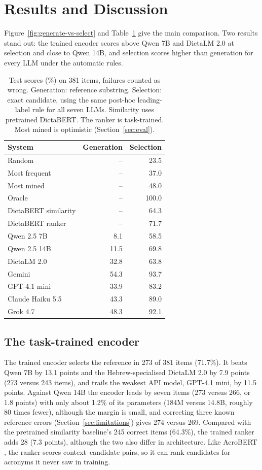 \section{Results and Discussion}
\label{sec:results}
Figure~\ref{fig:generate-vs-select} and Table~\ref{tab:test-results} give the main comparison. Two results stand out: the trained encoder scores above Qwen 7B and DictaLM 2.0 at selection and close to Qwen 14B, and selection scores higher than generation for every LLM under the automatic rules.
\begin{table}[H]
\centering\small
\begin{tabular}{@{}lrr@{}}
\toprule
System & Generation & Selection \\
\midrule
Random & -- & 23.5 \\
Most frequent & -- & 37.0 \\
Most mined & -- & 48.0 \\
Oracle & -- & 100.0 \\
\midrule
DictaBERT similarity & -- & 64.3 \\
DictaBERT ranker & -- & 71.7 \\
\midrule
Qwen 2.5 7B & 8.1 & 58.5 \\
Qwen 2.5 14B & 11.5 & 69.8 \\
DictaLM 2.0 & 32.8 & 63.8 \\
Gemini & 54.3 & 93.7 \\
GPT-4.1 mini & 33.9 & 83.2 \\
Claude Haiku 5.5 & 43.3 & 89.0 \\
Grok 4.7 & 48.3 & 92.1 \\
\bottomrule
\end{tabular}
\caption{Test scores (\%) on 381 items, failures counted as wrong. Generation: reference substring. Selection: exact candidate, using the same post-hoc leading-label rule for all seven LLMs. Similarity uses pretrained DictaBERT. The ranker is task-trained. Most mined is optimistic (Section~\ref{sec:eval}).}
\label{tab:test-results}
\end{table}

\subsection{The task-trained encoder}
\label{sec:res-encoder}
The trained encoder selects the reference in 273 of 381 items (71.7\%). It beats Qwen 7B by 13.1 points and the Hebrew-specialised DictaLM 2.0 by 7.9 points (273 versus 243 items), and trails the weakest API model, GPT-4.1 mini, by 11.5 points. Against Qwen 14B the encoder leads by seven items (273 versus 266, or 1.8 points) with only about 1.2\% of its parameters (184M versus 14.8B, roughly 80 times fewer), although the margin is small, and correcting three known reference errors (Section~\ref{sec:limitations}) gives 274 versus 269. Compared with the pretrained similarity baseline's 245 correct items (64.3\%), the trained ranker adds 28 (7.3 points), although the two also differ in architecture. Like AcroBERT \citep{chen2023gladis}, the ranker scores context--candidate pairs, so it can rank candidates for acronyms it never saw in training.


